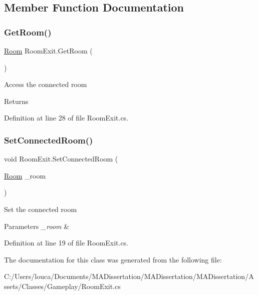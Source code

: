 \subsection{Member Function Documentation}
\mbox{\label{class_room_exit_a43eb9678e9d5a584e124d88d7da03d52}} 
\subsubsection{\texorpdfstring{Get\+Room()}{GetRoom()}}
{\footnotesize\ttfamily \mbox{\hyperlink{class_level_generation_1_1_room}{Room}} Room\+Exit.\+Get\+Room (\begin{DoxyParamCaption}{ }\end{DoxyParamCaption})}



Access the connected room 

\begin{DoxyReturn}{Returns}

\end{DoxyReturn}


Definition at line 28 of file Room\+Exit.\+cs.

\mbox{\label{class_room_exit_adfc62765726e94628e9f04191d940a04}} 
\subsubsection{\texorpdfstring{Set\+Connected\+Room()}{SetConnectedRoom()}}
{\footnotesize\ttfamily void Room\+Exit.\+Set\+Connected\+Room (\begin{DoxyParamCaption}\item[{\mbox{\hyperlink{class_level_generation_1_1_room}{Room}}}]{\+\_\+room }\end{DoxyParamCaption})}



Set the connected room 


\begin{DoxyParams}{Parameters}
{\em \+\_\+room} & \\
\hline
\end{DoxyParams}


Definition at line 19 of file Room\+Exit.\+cs.



The documentation for this class was generated from the following file\+:\begin{DoxyCompactItemize}
\item 
C\+:/\+Users/louca/\+Documents/\+M\+A\+Dissertation/\+M\+A\+Dissertation/\+M\+A\+Dissertation/\+Assets/\+Classes/\+Gameplay/Room\+Exit.\+cs\end{DoxyCompactItemize}
